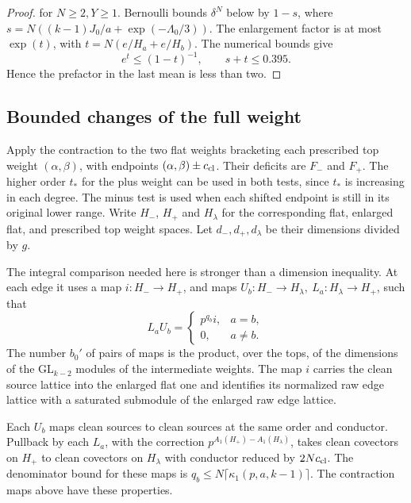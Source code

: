 \begin{proof}
for \(N\ge2,Y\ge1\).
Bernoulli bounds \(\delta^N\) below by \(1-s\), where
\(s=N((k-1)J_0/a+\exp(-\Lambda_0/3))\).
The enlargement factor is at most \(\exp(t)\), with
\(t=N(e/H_a+e/H_b)\). The numerical bounds give
\[
 e^t\le(1-t)^{-1},\qquad s+t\le0.395.
\]
Hence the prefactor
in the last mean is less than two.

\end{proof}



\subsection{Bounded changes of the full weight}

Apply the contraction to the two flat weights bracketing each prescribed top weight \((\alpha,\beta)\), with endpoints \((\alpha,\beta)\pm c_{\rm cl}\). Their deficits
are \(F_-\) and \(F_+\). The higher order \(t_*\) for the plus
weight can be used in both tests, since \(t_*\) is increasing in
each degree. The minus test is used when each shifted endpoint
is still in its original lower range. Write \(H_-\), \(H_+\)
and \(H_\lambda\) for the corresponding flat, enlarged flat,
and prescribed top weight spaces. Let \(d_-,d_+,d_\lambda\)
be their dimensions divided by \(g\).

The integral comparison needed here is stronger than a dimension
inequality. At each edge it uses a map \(i:H_-\to H_+\),
and maps \(U_b:H_-\to H_\lambda,\ L_a:H_\lambda\to H_+\),
such that
\[
 L_a U_b= \begin{cases}p^{q_b}i,&a=b,\\0,&a\ne b.\end{cases}
\]
The number \(b_0'\) of pairs of maps is the product, over the
tops, of the dimensions of the \(\mathrm{GL}_{k-2}\) modules
of the intermediate weights. The map \(i\) carries the
clean source lattice into the enlarged flat one and identifies
its normalized raw edge lattice with a saturated submodule
of the enlarged raw edge lattice.

Each \(U_b\) maps clean
sources to clean sources at the same order and conductor.
Pullback by each \(L_a\), with the correction
\(p^{A_1(H_+)-A_1(H_\lambda)}\), takes clean covectors on
\(H_+\) to clean covectors on \(H_\lambda\) with conductor
reduced by \(2Nc_{\rm cl}\). The denominator bound for these maps is
\(q_b\le N\lceil\kappa_1(p,a,k-1)\rceil\).
The contraction maps above have these properties.

